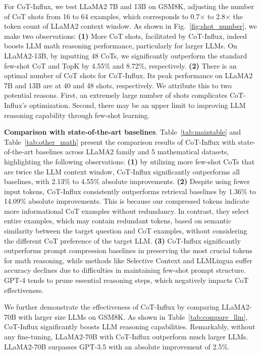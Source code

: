 For {CoT-Influx}, we test LLaMA2 7B and 13B on GSM8K, adjusting  the number of CoT shots from 16 to 64 examples, which corresponds to 0.7$\times$ to 2.8$\times$ the token count of LLaMA2 context window. As shown in Fig.~\ref{fig:shot_number}, we make two observations: \textbf{(1)} More  CoT shots, facilitated by {CoT-Influx}, indeed boosts LLM math reasoning performance, particularly for larger  LLMs. On LLaMA2-13B, by inputting 48 CoTs, we significantly outperform the standard few-shot CoT and TopK by 4.55\% and 8.72\%, respectively. \textbf{(2)} There is an optimal number of CoT shots for {CoT-Influx}. Its peak performance on LLaMA2 7B and 13B are at 40 and 48 shots, respectively. We attribute this to two potential reasons. First, an extremely large number of shots complicates {CoT-Influx}'s optimization. Second, there may be an upper limit to improving LLM reasoning capability through few-shot learning. 

\textbf{Comparison with state-of-the-art baselines}.  Table~\ref{tab:maintable} and Table~\ref{tab:other_math} present the comparison results of {CoT-Influx} with state-of-the-art baselines across LLaMA2 family and 5 mathematical datasets, highlighting the following observations: \textbf{(1)} by utilizing more few-shot CoTs that are twice the  LLM context window, {CoT-Influx} significantly outperforms all baselines, with 2.13\% to 4.55\% absolute improvements. \textbf{(2)} Despite using fewer input tokens,  {CoT-Influx} consistently outperforms retrieval baselines by 1.36\% to 14.09\% absolute improvements. This is because our compressed tokens indicate more informational CoT examples without redundancy. In contrast, they select entire examples, which may contain redundant tokens, based on semantic similarity between the target question and CoT examples, without considering the different CoT preference of the target LLM. \textbf{(3)} {CoT-Influx} significantly outperforms prompt compression baselines in preserving the most crucial tokens for math reasoning, while methods like Selective Context and LLMLingua suffer accuracy declines due to difficulties in maintaining few-shot prompt structure. GPT-4 tends to prune essential reasoning steps, which negatively impacts CoT effectiveness. 

We further demonstrate the effectiveness of {CoT-Influx} by comparing LLaMA2-70B with larger size LLMs on GSM8K. As shown in Table~\ref{tab:compare_llm}, {CoT-Influx} significantly boosts LLM reasoning capabilities. Remarkably, without any fine-tuning, LLaMA2-70B with {CoT-Influx}  outperform much larger LLMs.  LLaMA2-70B surpasses GPT-3.5 with an absolute improvement of 2.5\%.

